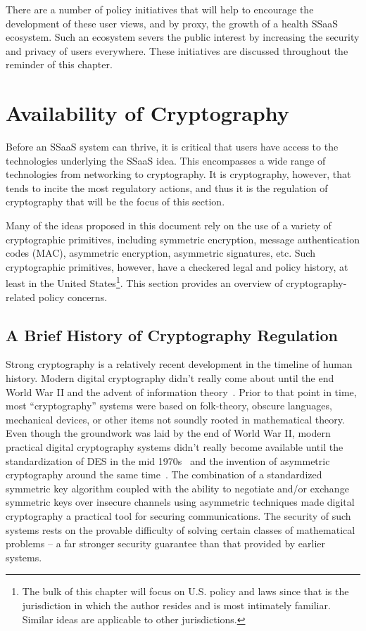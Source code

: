 There are a number of policy initiatives that will help to encourage
the development of these user views, and by proxy, the growth of a
health SSaaS ecosystem. Such an ecosystem severs the public interest
by increasing the security and privacy of users everywhere. These
initiatives are discussed throughout the reminder of this chapter.

\section{Availability of Cryptography}
\label{chap:policy:crypto}

Before an SSaaS system can thrive, it is critical that users have
access to the technologies underlying the SSaaS idea. This encompasses
a wide range of technologies from networking to cryptography. It is
cryptography, however, that tends to incite the most regulatory
actions, and thus it is the regulation of cryptography that will be
the focus of this section.

Many of the ideas proposed in this document rely on the use of a
variety of cryptographic primitives, including symmetric encryption,
message authentication codes (MAC), asymmetric encryption, asymmetric
signatures, etc. Such cryptographic primitives, however, have a
checkered legal and policy history, at least in the United
States\footnote{The bulk of this chapter will focus on U.S. policy and
  laws since that is the jurisdiction in which the author resides and
  is most intimately familiar. Similar ideas are applicable to other
  jurisdictions.}. This section provides an overview of
cryptography-related policy concerns.

\subsection{A Brief History of Cryptography Regulation}

Strong cryptography is a relatively recent development in the timeline
of human history. Modern digital cryptography didn't really come about
until the end World War II and the advent of information
theory~\cite{shannon1945}. Prior to that point in time, most
``cryptography'' systems were based on folk-theory, obscure languages,
mechanical devices, or other items not soundly rooted in mathematical
theory. Even though the groundwork was laid by the end of World War
II, modern practical digital cryptography systems didn't really become
available until the standardization of DES in the mid
1970s~\cite{fips46} and the invention of asymmetric cryptography
around the same time~\cite{diffie1976}. The combination of a
standardized symmetric key algorithm coupled with the ability to
negotiate and/or exchange symmetric keys over insecure channels using
asymmetric techniques made digital cryptography a practical tool for
securing communications. The security of such systems rests on the
provable difficulty of solving certain classes of mathematical
problems -- a far stronger security guarantee than that provided by
earlier systems.

